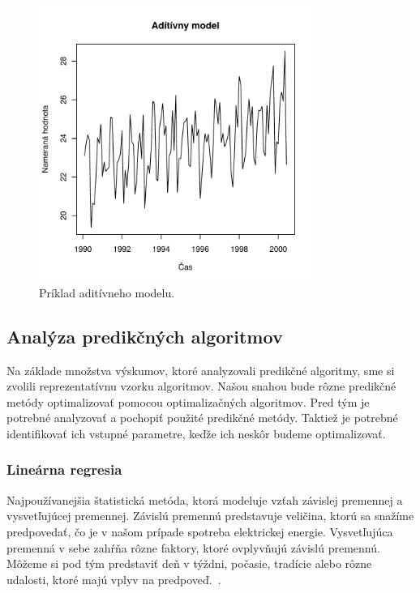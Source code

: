 \documentclass[a4paper,slovak,12pt,appendix]{article}
\begin{document}
\begin{figure}[!ht]
  \centering
  \includegraphics[width=0.8\textwidth]{add_model.pdf}
  \caption{Príklad aditívneho modelu.}
  \label{fig-add-model}
\end{figure}


\subsection{Analýza predikčných algoritmov}
Na základe množstva výskumov, ktoré analyzovali predikčné algoritmy, sme si
zvolili reprezentatívnu vzorku algoritmov. Našou snahou bude rôzne predikčné
metódy optimalizovať pomocou optimalizačných algoritmov. Pred tým je potrebné
analyzovať a pochopiť použité predikčné metódy. Taktiež je potrebné
identifikovať ich vstupné parametre, keďže ich neskôr budeme optimalizovať.


\subsubsection{Lineárna regresia}
Najpoužívanejšia štatistická metóda, ktorá modeluje vzťah závislej premennej
a vysvetľujúcej premennej. Závislú premennú predstavuje veličina, ktorú sa
snažíme predpovedať, čo je v našom prípade spotreba elektrickej energie.
Vysvetľujúca premenná v sebe zahŕňa rôzne faktory, ktoré ovplyvňujú závislú
premennú. Môžeme si pod tým predstaviť deň v týždni, počasie, tradície alebo rôzne
udalosti, ktoré majú vplyv na predpoveď.~\cite{KumarSingh2013, Mahalakshmi2016}.
\end{document}
